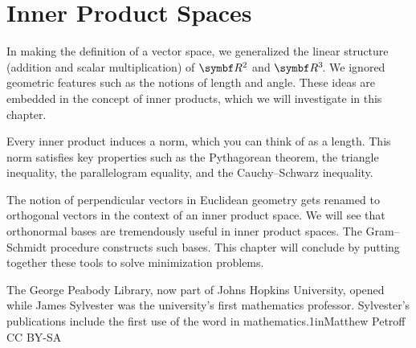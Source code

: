 
\chapter{Inner Product Spaces} \label{InnerProductSpaces}  %

In making the definition of a vector space, we generalized the linear structure
(addition and scalar multiplication) of $\R{2}$ and $\RR{3}$.  We ignored geometric features such as the notions of length and angle.  These ideas are embedded in the concept of inner products, which we will investigate in this chapter.

Every inner product induces a norm, which you can think of as a length. This norm satisfies key properties such as the Pythagorean theorem, the triangle inequality, the parallelogram equality, and the Cauchy--Schwarz inequality.

The notion of perpendicular vectors in Euclidean geometry gets renamed to orthogonal vectors in the context of an inner product space. We will see that orthonormal bases are tremendously useful in inner product spaces. The Gram--Schmidt procedure constructs such bases. This chapter will conclude by putting together these tools to solve minimization problems.

%
{The George Peabody Library, now part of Johns Hopkins University, opened while James Sylvester  was the university's first mathematics professor. Sylvester's publications include the first use of the word  in mathematics.}{1in}{Matthew Petroff CC BY-SA}


